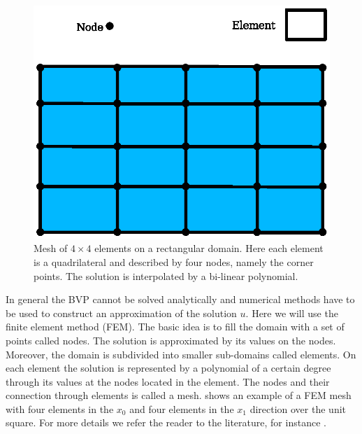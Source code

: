 \begin{figure}[ht]
    \centerline{\includegraphics{FirstStepMesh}}
    \caption{Mesh of $4 \times 4$ elements on a rectangular domain. Here
    each element is a quadrilateral and described by four nodes, namely
    the corner points. The solution is interpolated by a bi-linear
    polynomial.}
    \label{fig:FirstSteps.2}
\end{figure}

In general the BVP cannot be solved
analytically and numerical methods have to be used to construct an
approximation of the solution $u$.
Here we will use the finite element method
(FEM).
The basic idea is to fill the domain with a set of points called nodes.
The solution is approximated by its values on the nodes.
Moreover, the domain is subdivided into smaller sub-domains called
elements.
On each element the solution is represented by a polynomial of a certain
degree through its values at the nodes located in the element.
The nodes and their connection through elements is called a
mesh.  shows an
example of a FEM mesh with four elements in the $x_0$ and four elements
in the $x_1$ direction over the unit square.
For more details we refer the reader to the literature, for instance .

